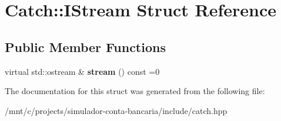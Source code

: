 \hypertarget{structCatch_1_1IStream}{}\section{Catch\+:\+:I\+Stream Struct Reference}
\label{structCatch_1_1IStream}
\subsection*{Public Member Functions}
\begin{DoxyCompactItemize}
\item 
\mbox{\label{structCatch_1_1IStream_a55a9ddbe250261ff38642f480ebdd902}} 
virtual std\+::ostream \& {\bfseries stream} () const =0
\end{DoxyCompactItemize}


The documentation for this struct was generated from the following file\+:\begin{DoxyCompactItemize}
\item 
/mnt/c/projects/simulador-\/conta-\/bancaria/include/catch.\+hpp\end{DoxyCompactItemize}
